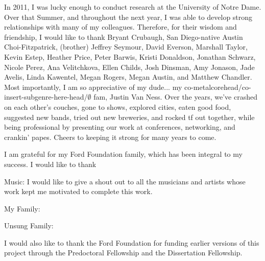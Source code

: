 {  In 2011, I was lucky enough to conduct research at the University of Notre Dame. Over that Summer, and throughout the next year, I was able to develop strong relationships with many of my colleagues. Therefore, for their wisdom and friendship, I would like to thank Bryant Crubaugh,  San Diego-native Austin Choi-Fitzpatrick, (brother) Jeffrey Seymour, David Everson, Marshall Taylor, Kevin Estep, Heather Price, Peter Barwis, Kristi Donaldson, Jonathan Schwarz, Nicole Perez, Ana Velitchkova, Ellen Childs, Josh Dinsman, Amy Jonason, Jade Avelis, Linda Kawentel, Megan Rogers, Megan Austin, and Matthew Chandler. Most importantly, I am so appreciative of my dude... my co-metalcorehead/co-insert-subgenre-here-head/$\emptyset$ fam, Justin Van Ness. Over the years, we've crashed on each other's couches, gone to shows, explored cities, eaten good food, suggested new bands, tried out new breweries, and rocked tf out together, while being professional by presenting our work at conferences, networking, and crankin' papes. Cheers to keeping it strong for many years to come.
  
I am grateful for my Ford Foundation family, which has been integral to my success. I would like to thank 
  
  Music: I would like to give a shout out to all the musicians and artists whose work kept me motivated to complete this work.
  
  My Family:
  
  Unsung Family: 
  
  I would also like to thank the Ford Foundation for funding earlier versions of this project through the Predoctoral Fellowship and the Dissertation Fellowship. 
  
}



